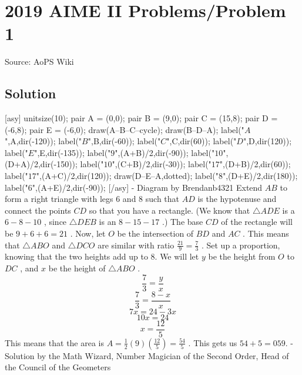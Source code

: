 \documentclass[12pt]{article}
\begin{document}
\section*{{2019 AIME II Problems/Problem 1}}
Source: AoPS Wiki

\subsection*{Solution}
[asy] unitsize(10); pair A = (0,0); pair B = (9,0); pair C = (15,8); pair D = (-6,8); pair E = (-6,0); draw(A--B--C--cycle); draw(B--D--A); label("$A$",A,dir(-120)); label("$B$",B,dir(-60)); label("$C$",C,dir(60)); label("$D$",D,dir(120)); label("$E$",E,dir(-135)); label("$9$",(A+B)/2,dir(-90)); label("$10$",(D+A)/2,dir(-150)); label("$10$",(C+B)/2,dir(-30)); label("$17$",(D+B)/2,dir(60)); label("$17$",(A+C)/2,dir(120)); draw(D--E--A,dotted); label("$8$",(D+E)/2,dir(180)); label("$6$",(A+E)/2,dir(-90)); [/asy] - Diagram by Brendanb4321 Extend $AB$ to form a right triangle with legs $6$ and $8$ such that $AD$ is the hypotenuse and connect the points $CD$ so
that you have a rectangle. (We know that $\triangle ADE$ is a $6-8-10$ , since $\triangle DEB$ is an $8-15-17$ .) The base $CD$ of the rectangle will be $9+6+6=21$ . Now, let $O$ be the intersection of $BD$ and $AC$ . This means that $\triangle ABO$ and $\triangle DCO$ are similar with ratio $\frac{21}{9}=\frac73$ . Set up a proportion, knowing that the two heights add up to 8. We will let $y$ be the height from $O$ to $DC$ , and $x$ be the height of $\triangle ABO$ . \[\frac{7}{3}=\frac{y}{x}\] \[\frac{7}{3}=\frac{8-x}{x}\] \[7x=24-3x\] \[10x=24\] \[x=\frac{12}{5}\] This means that the area is $A=\tfrac{1}{2}(9)(\tfrac{12}{5})=\tfrac{54}{5}$ . This gets us $54+5=\boxed{059}.$ -Solution by the Math Wizard, Number Magician of the Second Order, Head of the Council of the Geometers
\end{document}
